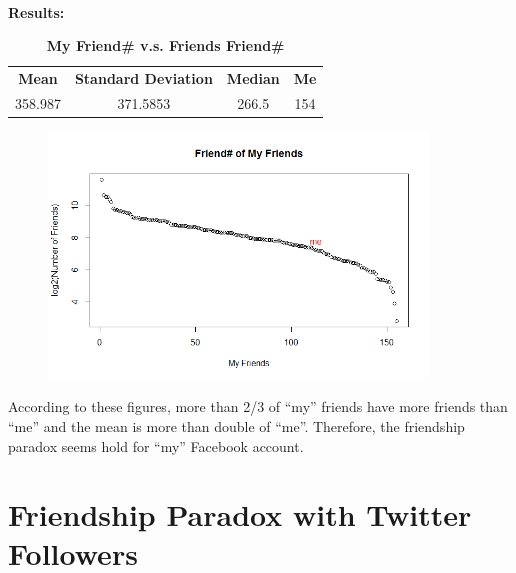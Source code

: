 \documentclass{article}
\begin{document}
		\noindent\\\textbf{Results:}
		\begin{table}[!htb]
			\centering
			\caption{\textbf{My Friend\# v.s. Friends Friend\#}}
			\begin{tabular}{cccc}
				\toprule
				\textbf{Mean} & \textbf{Standard Deviation} & \textbf{Median} & \textbf{Me}\\
				358.987 & 371.5853 & 266.5 & 154\\
				\bottomrule
			\end{tabular}
		\end{table}
		\begin{figure}[!htb]
			\centering 
			\href{https://github.com/zhangboroy/cs532-s17/blob/master/assg04_submission/FacebookFriends.png}
			{\includegraphics[width=0.9\textwidth]{FacebookFriends.png}}
			\label{fig:Facebook Friends} 
		\end{figure}

		According to these figures, more than 2/3 of ``my'' friends have more friends than ``me'' and the mean is more than double of ``me''. Therefore, the friendship paradox seems hold for ``my'' Facebook account.\\
		\section{Friendship Paradox with Twitter Followers}
\end{document}
